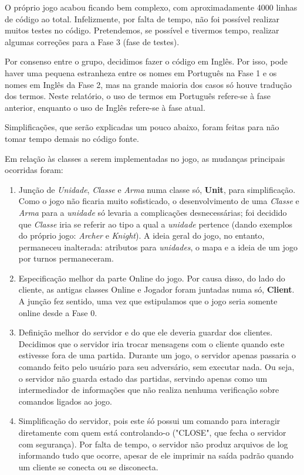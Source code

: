     O próprio jogo acabou ficando bem complexo, com aproximadamente 4000 linhas de código ao total. Infelizmente, por falta de tempo, não foi possível realizar muitos testes no código. Pretendemos, se possível e tivermos tempo, realizar algumas correções para a Fase 3 (fase de testes). \par

    Por consenso entre o grupo, decidimos fazer o código em Inglês. Por isso, pode haver uma pequena estranheza entre os nomes em Português na Fase 1 e os nomes em Inglês da Fase 2, mas na grande maioria dos casos só houve tradução dos termos. Neste relatório, o uso de termos em Português refere-se à fase anterior, enquanto o uso de Inglês refere-se à fase atual.\par

    Simplificações, que serão explicadas um pouco abaixo, foram feitas para não tomar tempo demais no código fonte. \par

    Em relação às classes a serem implementadas no jogo, as mudanças principais ocorridas foram:
    \begin{enumerate}
        \item Junção de \emph{Unidade}, \emph{Classe} e \emph{Arma} numa classe só, \textbf{Unit}, para simplificação. Como o jogo não ficaria muito sofisticado, o desenvolvimento de uma \emph{Classe} e \emph{Arma} para a \emph{unidade} só levaria a complicações desnecessárias; foi decidido que \emph{Classe} iria se referir ao tipo a qual a \emph{unidade} pertence (dando exemplos do próprio jogo: \emph{Archer} e \emph{Knight}). A ideia geral do jogo, no entanto, permaneceu inalterada: atributos para \emph{unidades}, o mapa e a ideia de um jogo por turnos permaneceram.
        \item Especificação melhor da parte Online do jogo. Por causa disso, do lado do cliente, as antigas classes Online e Jogador foram juntadas numa só, \textbf{Client}. A junção fez sentido, uma vez que estipulamos que o jogo seria somente online desde a Fase 0.
        \item Definição melhor do servidor e do que ele deveria guardar dos clientes. Decidimos que o servidor iria trocar mensagens com o cliente quando este estivesse fora de uma partida. Durante um jogo, o servidor apenas passaria o comando feito pelo usuário para seu adversário, sem executar nada. Ou seja, o servidor não guarda estado das partidas, servindo apenas como um intermediador de informações que não realiza nenhuma verificação sobre comandos ligados ao jogo.
        \item Simplificação do servidor, pois este śó possui um comando para interagir diretamente com quem está controlando-o ("CLOSE", que fecha o servidor com segurança). Por falta de tempo, o servidor não produz arquivos de log informando tudo que ocorre, apesar de ele imprimir na saída padrão quando um cliente se conecta ou se disconecta.
    \end{enumerate}

